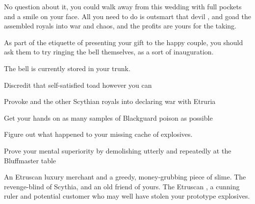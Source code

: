 \documentclass[char]{Kos}
\begin{document}
No question about it, you could walk away from this wedding with full pockets and a smile on your face. All you need to do is outsmart that devil \cMerchant{}, and goad the assembled royals into war and chaos, and the profits are yours for the taking.


\begin{itemz}[Notes]
  \item As part of the etiquette of presenting your gift to the happy couple, you should ask them to try ringing the bell themselves, as a sort of inauguration.
  \item The bell is currently stored in your trunk.
\end{itemz}

\begin{itemz}[Goals]
\item Discredit that self-satisfied toad \cMerchant{} however you can
\item Provoke \cScythiaQueen{\Monarch} \cScythiaQueen{} and the other Scythian royals into declaring war with Etruria
\item Get your hands on as many samples of Blackguard poison as possible
\item Figure out what happened to your missing cache of explosives.
\item Prove your mental superiority by demolishing \cMerchant{} utterly and repeatedly at the Bluffmaster table
\end{itemz}

\begin{contacts}
\contact{\cMerchant{}} An Etruscan luxury merchant and a greedy, money-grubbing piece of slime.
\contact{\cScythiaQueen{}} The revenge-blind \cScythiaQueen{\monarch} of Scythia, and an old friend of yours.
\contact{\cEtruriaKing{}} The Etruscan \cEtruriaKing{\monarch}, a cunning ruler and potential customer who may well have stolen your prototype explosives.
\end{contacts}
\end{document}
